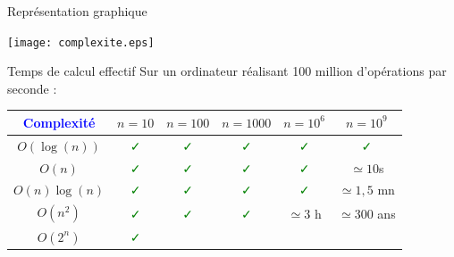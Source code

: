 \documentclass[10pt]{beamer}
\begin{document}
\begin{frame}[fragile]{\Ctitle}{\stitle}
	\begin{block}{Représentation graphique}
		\begin{center}
			\texttt{[image: complexite.eps]}
		\end{center}
	\end{block}
\end{frame}

\begin{frame}[fragile]{\Ctitle}{\stitle}
	\begin{block}{Temps de calcul effectif}
		Sur un ordinateur réalisant 100 million d'opérations par seconde :
		\renewcommand{\arraystretch}{1.3}
		\begin{tabular}{|c|c|c|c|c|c|}
			\hline
			\textcolor{blue}{Complexité} & $n=10$                      & $n=100$                     & $n=1000$                    & $n=10^6$                    & $n=10^9$                      \\
			\hline
			$O(\log(n))$   & \textcolor{green}{\faCheck} & \textcolor{green}{\faCheck} & \textcolor{green}{\faCheck} & \textcolor{green}{\faCheck} & \textcolor{green}{\faCheck} \\
			\hline
			$O(n)$   & \textcolor{green}{\faCheck} & \textcolor{green}{\faCheck} & \textcolor{green}{\faCheck} & \textcolor{green}{\faCheck} & $\simeq 10$s \\
			\hline
			$O(n)\log(n)$   & \textcolor{green}{\faCheck} & \textcolor{green}{\faCheck} & \textcolor{green}{\faCheck} & \textcolor{green}{\faCheck} & $\simeq 1,5$ mn \\
			\hline
			$O(n^2)$   & \textcolor{green}{\faCheck} & \textcolor{green}{\faCheck} & \textcolor{green}{\faCheck} & $\simeq 3$ h & $\simeq 300$ ans \\
			\hline
			$O(2^n)$   & \textcolor{green}{\faCheck} &  \textcolor{red}{\faTimes} &  \textcolor{red}{\faTimes} &  \textcolor{red}{\faTimes} &  \textcolor{red}{\faTimes} \\
			\hline
		\end{tabular}
	\end{block}
\end{frame}
\end{document}
